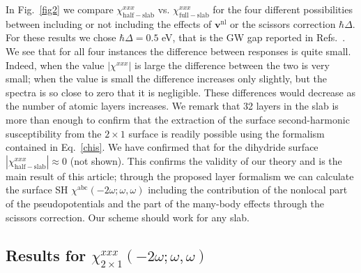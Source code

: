 \documentclass[floatfix,prb,aps,superscriptaddress,showpacs,11pt,preprint,letterpaper]{revtex4}
\begin{document}
In Fig.~\ref{fig2}
we compare 
$\chi^{xxx}_{\mathrm{half-slab}}$  
vs. 
$\chi^{xxx}_{\mathrm{full-slab}}$ 
for the four different possibilities 
between including or not including the
effects of $\mathbf{v}^\mathrm{nl}$ or the scissors correction
$\hbar\Delta$.   
For these results we chose
$\hbar\Delta=0.5$ eV, that is the GW gap reported in
Refs.~. 
We see that for all four instances the 
difference between responses is quite small.
Indeed, when the value $|\chi^{xxx}|$ 
is large the difference between the two is very small; 
when the value is small the difference increases only slightly, 
but the spectra is so close to zero that it is negligible. 
These differences would decrease as the number of atomic layers 
increases. We remark that 32 layers in the slab is more than enough 
to confirm that the extraction of the surface second-harmonic 
susceptibility from the $2\times 1$ surface is readily possible 
using the formalism contained in Eq.~\eqref{chis}.
We have confirmed that for the dihydride surface
$|\chi^{xxx}_{\mathrm{half-slab}}|\approx 0$ (not shown).
This confirms the validity of our theory and is the main result of
this article; through the proposed layer formalism we can calculate the surface SH
$\chi^{\mathrm{a}\mathrm{b}\mathrm{c}}(-2\omega;\omega,\omega)$    
including
the
contribution of the nonlocal part of the pseudopotentials 
and the part of the many-body effects through the scissors correction.
Our scheme should work for any slab.  

\subsection{\texorpdfstring{Results for $\chi^{xxx}_{2\times 1}(-2\omega;\omega,\omega)$}
{Results for Xxxx(2x1)(-2w;w,w)}}
\end{document}
